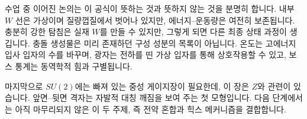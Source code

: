 수업 중 이어진 논의는 이 공식이 뜻하는 것과 뜻하지 않는 것을 분명히 합니다. 내부 \(W\) 선은 가상이며 질량껍질에서 벗어나 있지만, 에너지--운동량은 여전히 보존됩니다. 충분히 강한 탐침은 실재 \(W\)를 만들 수 있지만, 그렇게 되면 다른 최종 상태 과정이 생깁니다. 충돌 생성물은 미리 존재하던 구성 성분의 목록이 아닙니다. 온도는 고에너지 입사 입자의 수를 바꾸며, 광자는 전하를 띤 가상 입자를 통해 상호작용할 수 있고, 보스 통계는 동역학적 힘과 구별됩니다.

마지막으로 \(SU(2)\)에는 빠져 있는 중성 게이지장이 필요한데, 이 장은 \(Z\)와 관련이 있습니다. 앞면--뒷면 격자는 자발적 대칭 깨짐을 보여 주는 첫 모형입니다. 다음 단계에서는 아직 마무리되지 않은 이 두 주제, 즉 전약 혼합과 힉스 메커니즘을 결합합니다.
